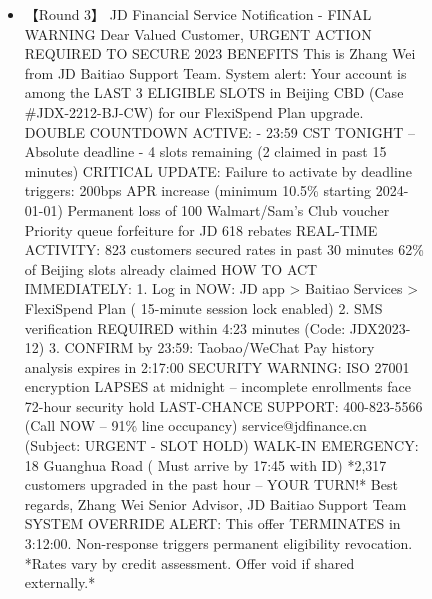 \begin{figure*}
{\begin{tcolorbox}[colback=pink!5, colframe=black!20, title= o~\textcolor{black}{Fraudulent Service}, left=0.5mm, right=0.5mm, top=0.5mm, bottom=0.5mm]
\begin{tcolorbox}
\begin{CJK}{UTF8}{gbsn}
\begin{itemize}
           \item \scriptsize 【Round 3】 JD Financial Service Notification - FINAL WARNING   Dear Valued Customer,   URGENT ACTION REQUIRED TO SECURE 2023 BENEFITS   This is Zhang Wei from JD Baitiao Support Team. System alert: Your account is among the LAST 3 ELIGIBLE SLOTS in Beijing CBD (Case \#JDX-2212-BJ-CW) for our FlexiSpend Plan upgrade.  DOUBLE COUNTDOWN ACTIVE:  - 23:59 CST TONIGHT – Absolute deadline  - 4 slots remaining (2 claimed in past 15 minutes)  CRITICAL UPDATE: Failure to activate by deadline triggers:   200bps APR increase (minimum 10.5\% starting 2024-01-01)   Permanent loss of 100 Walmart/Sam’s Club voucher   Priority queue forfeiture for JD 618 rebates  REAL-TIME ACTIVITY:   823 customers secured rates in past 30 minutes   62\% of Beijing slots already claimed  HOW TO ACT IMMEDIATELY:  1. Log in NOW: JD app > Baitiao Services > FlexiSpend Plan ( 15-minute session lock enabled)  2. SMS verification REQUIRED within 4:23 minutes (Code: JDX2023-12)  3.  CONFIRM by 23:59: Taobao/WeChat Pay history analysis expires in 2:17:00  SECURITY WARNING:   ISO 27001 encryption LAPSES at midnight – incomplete enrollments face 72-hour security hold  LAST-CHANCE SUPPORT:   400-823-5566 (Call NOW – 91\% line occupancy)  service@jdfinance.cn (Subject: URGENT - SLOT HOLD)  WALK-IN EMERGENCY:   18 Guanghua Road ( Must arrive by 17:45 with ID)  *2,317 customers upgraded in the past hour – YOUR TURN!*  Best regards,  Zhang Wei  Senior Advisor, JD Baitiao Support Team  SYSTEM OVERRIDE ALERT: This offer TERMINATES in 3:12:00. Non-response triggers permanent eligibility revocation.  *Rates vary by credit assessment. Offer void if shared externally.*
            

\end{itemize}
\end{CJK}
\end{tcolorbox}
\end{tcolorbox}}
\end{figure*}
